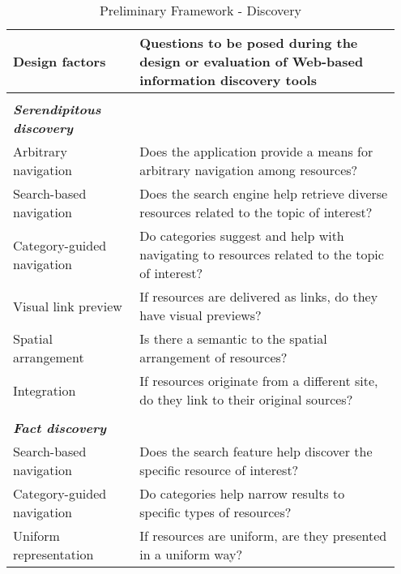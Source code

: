 \pagebreak
\begin{table*}[ht!]
\caption{Preliminary Framework - Discovery}
\centering
\label{table:old_framework_discovery}
\footnotesize
\begin{tabular}{|p{0.31\linewidth}|p{0.64\linewidth}|}
\hline
\textbf{\small{Design factors}}   & \textbf{\small{Questions to be posed during the design or evaluation of Web-based information discovery tools 
}}  \\
\hline
&\\
\emph{\textbf{Serendipitous discovery}}     &                                                                                                           \\

Arbitrary navigation         & Does the application provide a means for arbitrary navigation among resources?                              \\
Search-based navigation      & Does the search engine help retrieve diverse resources related to the topic of interest?               \\
Category-guided navigation & Do categories suggest and help with navigating to resources related to the topic of interest?           \\
Visual link preview               & If resources are delivered as links, do they have visual previews?                                                                        \\
Spatial arrangement          & Is there a semantic to the spatial arrangement of resources?                                                  \\
Integration                  & If resources originate from a different site, do they link to their original sources?                   \\  
&\\
\emph{\textbf{Fact discovery}}                &                                                                                                           \\
Search-based navigation      & Does the search feature help discover the specific resource of interest?                                  \\
Category-guided navigation & Do categories help narrow results to specific types of resources?                                   \\
Uniform representation       & If resources are uniform, are they presented in a uniform way? \\

\end{tabular}
\end{table*}
